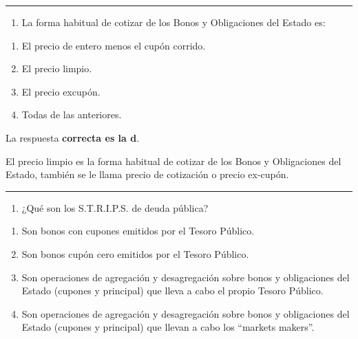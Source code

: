 \documentclass[
  letterpaper,
  DIV=11,
  numbers=noendperiod]{scrreprt}
\providecommand{\tightlist}{%
  \setlength{\itemsep}{0pt}\setlength{\parskip}{0pt}}\usepackage{longtable,booktabs,array}
\begin{document}
\begin{center}\rule{0.5\linewidth}{0.5pt}\end{center}

\begin{enumerate}
\def\labelenumi{\arabic{enumi}.}
\setcounter{enumi}{16}
\tightlist
\item
  La forma habitual de cotizar de los Bonos y Obligaciones del Estado
  es:
\end{enumerate}

\begin{enumerate}
\def\labelenumi{\alph{enumi}.}
\item
  El precio de entero menos el cupón corrido.
\item
  El precio limpio.
\item
  El precio excupón.
\item
  Todas de las anteriores.
\end{enumerate}

\begin{tcolorbox}[enhanced jigsaw, left=2mm, opacityback=0, colback=white, breakable, arc=.35mm, bottomrule=.15mm, rightrule=.15mm, toprule=.15mm, leftrule=.75mm, colframe=quarto-callout-tip-color-frame]
\begin{minipage}[t]{5.5mm}
\textcolor{quarto-callout-tip-color}{\faLightbulb}
\end{minipage}%
\begin{minipage}[t]{\textwidth - 5.5mm}

La respuesta \textbf{correcta es la d}.

El precio limpio es la forma habitual de cotizar de los Bonos y
Obligaciones del Estado, también se le llama precio de cotización o
precio ex-cupón.

\end{minipage}%
\end{tcolorbox}

\begin{center}\rule{0.5\linewidth}{0.5pt}\end{center}

\begin{enumerate}
\def\labelenumi{\arabic{enumi}.}
\setcounter{enumi}{17}
\tightlist
\item
  ¿Qué son los S.T.R.I.P.S. de deuda pública?
\end{enumerate}

\begin{enumerate}
\def\labelenumi{\alph{enumi}.}
\item
  Son bonos con cupones emitidos por el Tesoro Público.
\item
  Son bonos cupón cero emitidos por el Tesoro Público.
\item
  Son operaciones de agregación y desagregación sobre bonos y
  obligaciones del Estado (cupones y principal) que lleva a cabo el
  propio Tesoro Público.
\item
  Son operaciones de agregación y desagregación sobre bonos y
  obligaciones del Estado (cupones y principal) que llevan a cabo los
  ``markets makers''.
\end{enumerate}
\end{document}
